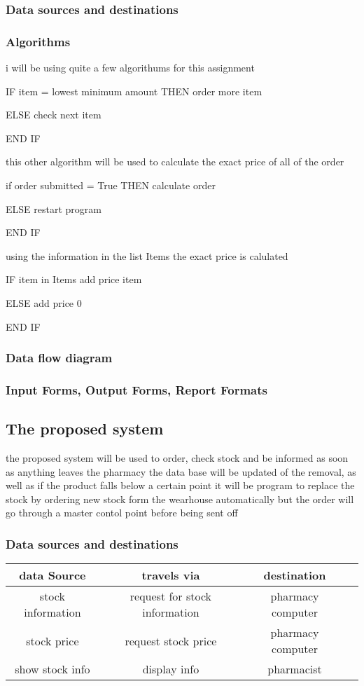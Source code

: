 \subsubsection{Data sources and destinations}

\subsubsection{Algorithms}

i will be using quite a few algorithums for this assignment

IF item = lowest minimum amount THEN
		order more item

ELSE
		check next item

END IF

this other algorithm will be used to calculate the exact price of all of the order 

if order submitted = True THEN
		calculate order

ELSE 
		restart program

END IF

using the information in the list Items the exact price is calulated

IF item in Items
		add price item

ELSE
		add price 0

END IF

\subsubsection{Data flow diagram}

\subsubsection{Input Forms, Output Forms, Report Formats}

\subsection{The proposed system}
the proposed system will be used to order, check stock and be informed as soon as anything leaves the pharmacy the data base will be updated of the removal, as well as if the product falls below a certain point it will be program to replace the stock by ordering new stock form the wearhouse automatically but the order will go through a master contol point before being sent off 
\subsubsection{Data sources and destinations}
\begin{table}
\centering
\begin{tabular}{c c c c}
\hline\hline
data Source & travels via & destination\\
\hline
stock information & request for stock information & pharmacy computer\\
stock price & request stock price & pharmacy computer\\
show stock info & display info & pharmacist\\
\hline
\end{tabular}
\label{table:nonlin}
\end{table}
